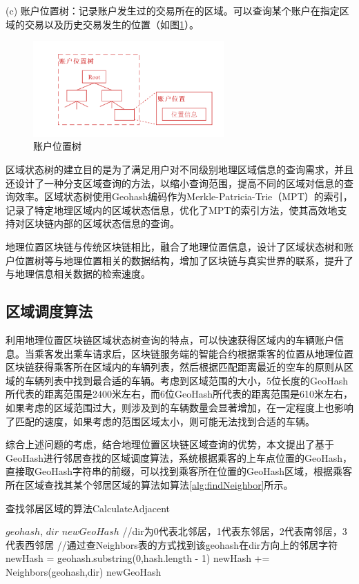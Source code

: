 (c) 账户位置树：记录账户发生过的交易所在的区域。可以查询某个账户在指定区域的交易以及历史交易发生的位置（如图\ref{fig:accountLocation}）。

\begin{figure}[h]
  \centering
  \includegraphics[width=0.65\textwidth]{figures/账户位置树}
  \caption{账户位置树}\label{fig:accountLocation}
\end{figure}

区域状态树的建立目的是为了满足用户对不同级别地理区域信息的查询需求，并且还设计了一种分支区域查询的方法，以缩小查询范围，提高不同的区域对信息的查询效率。区域状态树使用Geohash编码作为Merkle-Patricia-Trie（MPT）的索引，记录了特定地理区域内的区域状态信息，优化了MPT的索引方法，使其高效地支持对区块链内部的区域状态信息的查询。

地理位置区块链与传统区块链相比，融合了地理位置信息，设计了区域状态树和账户位置树等与地理位置相关的数据结构，增加了区块链与真实世界的联系，提升了与地理信息相关数据的检索速度。

\subsection{区域调度算法}

利用地理位置区块链区域状态树查询的特点，可以快速获得区域内的车辆账户信息。当乘客发出乘车请求后，区块链服务端的智能合约根据乘客的位置从地理位置区块链获得乘客所在区域内的车辆列表，然后根据匹配距离最近的空车的原则从区域的车辆列表中找到最合适的车辆。考虑到区域范围的大小，5位长度的GeoHash所代表的距离范围是2400米左右，而6位GeoHash所代表的距离范围是610米左右，如果考虑的区域范围过大，则涉及到的车辆数量会显著增加，在一定程度上也影响了匹配的速度，如果考虑的范围区域太小，则可能无法找到合适的车辆。

综合上述问题的考虑，结合地理位置区块链区域查询的优势，本文提出了基于GeoHash进行邻居查找的区域调度算法，系统根据乘客的上车点位置的GeoHash，直接取GeoHash字符串的前缀，可以找到乘客所在位置的GeoHash区域，根据乘客所在区域查找其某个邻居区域的算法如算法\ref{alg:findNeighbor}所示。

\begin{algorithm}[h]
  \caption{查找邻居区域的算法CalculateAdjacent}
  \label{alg:findNeighbor}
  \begin{algorithmic}[1]
    \REQUIRE $geohash$, $dir$
    \ENSURE $newGeoHash$
    \STATE //dir为0代表北邻居，1代表东邻居，2代表南邻居，3代表西邻居
    \STATE //通过查Neighbors表的方式找到该geohash在dir方向上的邻居字符
    \STATE newHash = geohash.substring(0,hash.length - 1)
    \STATE newHash += Neighbors(geohash,dir)
    \RETURN newGeoHash
    \end{algorithmic}
\end{algorithm}

